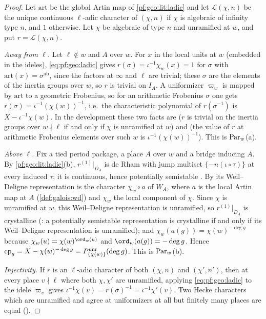 \begin{proof}
Let $\mathrm{art}$ be the global Artin map of \cref{pf:geo:lit:ladic} and let $\mathcal L(\chi,n)$ be the unique
continuous $\ell$-adic character of $(\chi,n)$ if $\chi$ is algebraic of infinity type $n$, and $1$ otherwise.
Let $\chi$ be algebraic of type $n$ and unramified at $w$, and put $r=\mathcal L(\chi,n)$.

\emph{Away from $\ell$.} Let $\ell\notin w$ and $A$ over $w$. For $x$ in the local units at $w$
(embedded in the ideles), \eqref{eq:pf:geo:ladic} gives $r(\sigma)=\iota^{-1}\chi_w(x)=1$ for $\sigma$ with
$\mathrm{art}(x)=\sigma^{\mathrm{ab}}$, since the factors at $\infty$ and $\ell$ are trivial; these $\sigma$ are the
elements of the inertia groups over $w$, so $r$ is trivial on $I_A$. A uniformizer $\varpi_w$ is mapped by
$\mathrm{art}$ to a geometric Frobenius, so for an arithmetic Frobenius $\sigma$ one gets
$r(\sigma)=\iota^{-1}(\chi(w))^{-1}$, i.e.\ the characteristic polynomial of $r(\sigma^{-1})$ is $X-\iota^{-1}\chi(w)$.
In the development these two facts are  ($r$ is trivial
on the inertia groups over $w\nmid\ell$ if and only if $\chi$ is unramified at $w$) and
 (the value of $r$ at arithmetic Frobenius elements over
such $w$ is $\iota^{-1}(\chi(w))^{-1}$). This is $\mathrm{Par}_w$(a).

\emph{Above $\ell$.} Fix a tied period package, a place $A$ over $w$ and a bridge inducing $A$. By
\cref{pf:geo:lit:ladic}(b), $r^{(1)}|_{D_A}$ is de Rham with jump multiset $\{-n(\iota\circ\tau)\}$ at every
induced $\tau$; it is continuous, hence potentially semistable \cite{Berger2002}. By
 its Weil--Deligne representation is the character
$\chi_w\circ a$ of $W_A$, where $a$ is the local Artin map at $A$ (\cref{def:galois:wd}) and $\chi_w$ the local
component of $\chi$. Since $\chi$ is unramified at $w$, this Weil--Deligne representation is unramified, so
$r^{(1)}|_{D_A}$ is crystalline (: a potentially semistable
representation is crystalline if and only if its Weil--Deligne representation is unramified); and
$\chi_w(a(g))=\chi(w)^{-\deg g}$ because $\chi_w(u)=\chi(w)^{\ord_w(u)}$ and $\ord_w(a(g))=-\deg g$. Hence
$\mathrm{cp}_g=X-\chi(w)^{-\deg g}=P^{\mathrm{unr}}_{\{\chi(w)\}}(\deg g)$. This is $\mathrm{Par}_w$(b).

\emph{Injectivity.} If $r$ is an $\ell$-adic character of
both $(\chi,n)$ and $(\chi',n')$, then at every place $v\nmid\ell$ where both $\chi,\chi'$ are unramified,
applying \eqref{eq:pf:geo:ladic} to the idele $\varpi_v$ gives $\iota^{-1}\chi(v)=r(\sigma)^{-1}=\iota^{-1}\chi'(v)$.
Two Hecke characters which are unramified and agree at uniformizers at all but finitely many places
are equal ().
\end{proof}

